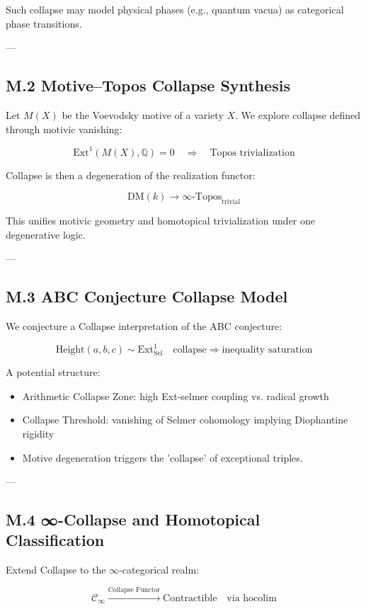 \documentclass[11pt]{article}
\begin{document}
\begin{axiom}
\begin{axiom}
{{Such collapse may model physical phases (e.g., quantum vacua) as categorical phase transitions.

---

\subsection*{M.2 Motive–Topos Collapse Synthesis}

Let $M(X)$ be the Voevodsky motive of a variety $X$.  
We explore collapse defined through motivic vanishing:

\[
\mathrm{Ext}^1(M(X), \mathbb{Q}) = 0 \quad \Rightarrow \quad \text{Topos trivialization}
\]

Collapse is then a degeneration of the realization functor:

\[
\mathrm{DM}(k) \to \infty\text{-Topos}_{\text{trivial}}
\]

This unifies motivic geometry and homotopical trivialization under one degenerative logic.

---

\subsection*{M.3 ABC Conjecture Collapse Model}

We conjecture a Collapse interpretation of the ABC conjecture:

\[
\text{Height}(a,b,c) \sim \mathrm{Ext}^1_{\mathrm{Sel}} \quad \text{collapse} \Rightarrow \text{inequality saturation}
\]

A potential structure:

\begin{itemize}
  \item Arithmetic Collapse Zone: high Ext-selmer coupling vs. radical growth
  \item Collapse Threshold: vanishing of Selmer cohomology implying Diophantine rigidity
  \item Motive degeneration triggers the 'collapse' of exceptional triples.
\end{itemize}

---

\subsection*{M.4 ∞-Collapse and Homotopical Classification}

Extend Collapse to the $\infty$-categorical realm:

\[
\mathcal{C}_\infty \xrightarrow{\text{Collapse Functor}} \text{Contractible} \quad \text{via }\mathrm{hocolim}
\]

}}
\end{axiom}
\end{axiom}
\end{document}

